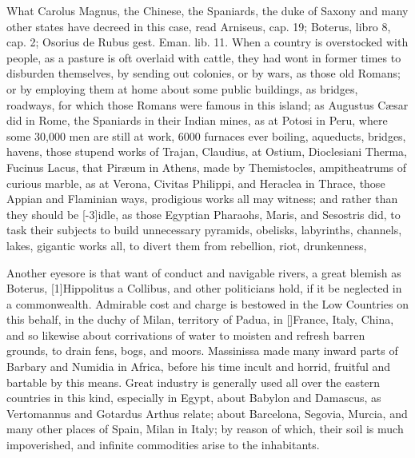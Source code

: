 {What Carolus Magnus, the Chinese, the Spaniards, the duke of Saxony and
many other states have decreed in this case, read Arniseus, cap. 19;
Boterus, libro 8, cap. 2; Osorius de Rubus gest. Eman. lib. 11. When a
country is overstocked with people, as a pasture is oft overlaid with
cattle, they had wont in former times to disburden themselves, by
sending out colonies, or by wars, as those old Romans; or by employing
them at home about some public buildings, as bridges, roadways, for
which those Romans were famous in this island; as Augustus C\ae{}sar did
in Rome, the Spaniards in their Indian mines, as at Potosi in Peru,
where some 30,000 men are still at work, 6000 furnaces ever boiling,
\etc{} aqueducts, bridges, havens, those stupend works of Trajan,
Claudius, at Ostium, Dioclesiani Therma, Fucinus Lacus, that
Pir\ae{}um in Athens, made by Themistocles, ampitheatrums of curious
marble, as at Verona, Civitas Philippi, and Heraclea in Thrace, those
Appian and Flaminian ways, prodigious works all may witness; and rather
than they should be [-3\baselineskip]idle, as those  Egyptian Pharaohs, Maris,
and Sesostris did, to task their subjects to build unnecessary
pyramids, obelisks, labyrinths, channels, lakes, gigantic works all, to
divert them from rebellion, riot, drunkenness, 

Another eyesore is that want of conduct and navigable rivers, a great
blemish as Boterus, [1\baselineskip]Hippolitus a Collibus, and other
politicians hold, if it be neglected in a commonwealth. Admirable cost
and charge is bestowed in the Low Countries on this behalf, in the
duchy of Milan, territory of Padua, in [\baselineskip]France, Italy, China, and
so likewise about corrivations of water to moisten and refresh barren
grounds, to drain fens, bogs, and moors. Massinissa made many inward
parts of Barbary and Numidia in Africa, before his time incult and
horrid, fruitful and bartable by this means. Great industry is
generally used all over the eastern countries in this kind, especially
in Egypt, about Babylon and Damascus, as Vertomannus and Gotardus
Arthus relate; about Barcelona, Segovia, Murcia, and many other places
of Spain, Milan in Italy; by reason of which, their soil is much
impoverished, and infinite commodities arise to the inhabitants.

}
